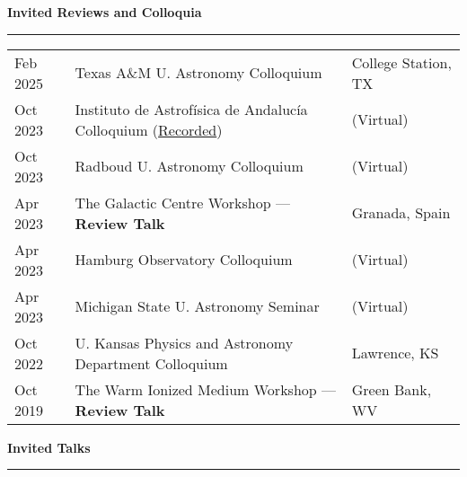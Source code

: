 \documentclass[11pt]{article}
\makeatletter
\def\vhrulefill#1{\leavevmode\leaders\hrule \@height #1\hfill \kern\z@}
\newcommand{\subsectionname}[1]{{\large\bf #1 \vhrulefill{0.5pt}}}
\makeatother
\begin{document}


\subsectionname{Invited Reviews and  Colloquia}\vspace{-6pt}

\begin{longtable}{p{} p{}p{}}


Feb 2025 & Texas A\&M U. Astronomy Colloquium & {\small College Station, TX}\\

Oct 2023 & Instituto de Astrof\'isica de Andaluc\'ia Colloquium {\small (\href{https://youtu.be/0gQPiKdQCm4}{Recorded})}& {\small (Virtual)}\\

Oct 2023 & Radboud U. Astronomy Colloquium & {\small (Virtual)}\\

Apr 2023 & The Galactic Centre Workshop --- {\bf Review Talk} & {\small Granada, Spain}\\

Apr 2023 & Hamburg Observatory Colloquium & {\small (Virtual)}\\

Apr 2023 & Michigan State U. Astronomy Seminar & {\small (Virtual)}\\

Oct 2022 & U. Kansas Physics and Astronomy Department Colloquium & {\small Lawrence, KS} \\

 Oct 2019 & The Warm Ionized Medium Workshop ---  {\bf Review Talk} & {\small Green Bank, WV}\\

\end{longtable}
\vspace{-12pt}


\subsectionname{Invited Talks}\vspace{-6pt}
\end{document}
